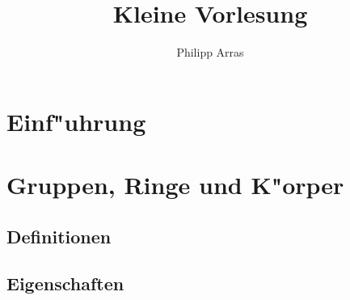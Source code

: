 \documentclass[11pt,a4paper]{article}
\author{Philipp Arras}
\title{Kleine Vorlesung}
\begin{document}
\maketitle
\tableofcontents
\section{Einf"uhrung}
\blindtext
\section{Gruppen, Ringe und K"orper}
\blindtext
\subsection{Definitionen}
\blindtext
\subsection{Eigenschaften}
\blindtext
\end{document}
